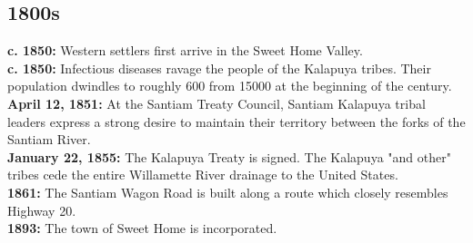 \subsection*{1800s}
\colorbox{Goldenrod!50}{\textbf{c. 1850:}} Western settlers first arrive in the Sweet Home Valley.\\
\colorbox{Goldenrod!50}{\textbf{c. 1850:}} Infectious diseases ravage the people of the Kalapuya tribes. Their population dwindles to roughly 600 from 15000 at the beginning of the century.\\
\colorbox{Goldenrod!50}{\textbf{April 12, 1851:}} At the Santiam Treaty Council, Santiam Kalapuya tribal leaders express a strong desire to maintain their territory between the forks of the Santiam River.\\
\colorbox{Goldenrod!50}{\textbf{January 22, 1855:}} The Kalapuya Treaty is signed. The Kalapuya "and other" tribes cede the entire Willamette River drainage to the United States.\\
\colorbox{Goldenrod!50}{\textbf{1861:}} The Santiam Wagon Road is built along a route which closely resembles Highway 20.\\
\colorbox{Goldenrod!50}{\textbf{1893:}} The town of Sweet Home is incorporated.\\
